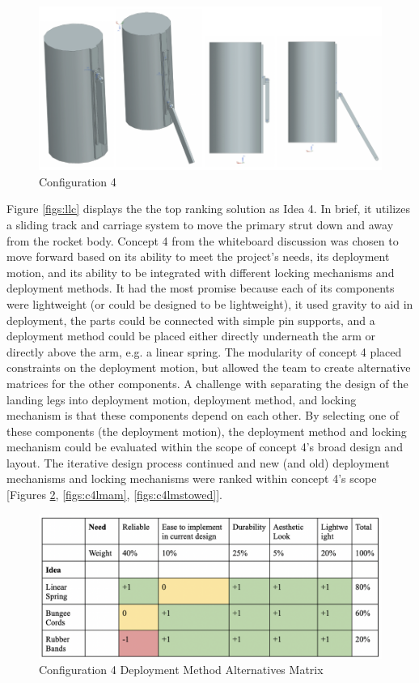 \begin{figure}[H]
\centering
\includegraphics[scale=0.8]{src/figs/landinglegconfig1.png}
\caption{Configuration 4}
\label{figs:llc1}
\end{figure}

Figure \ref{figs:llc} displays the the top ranking solution as Idea 4. In brief, it utilizes a sliding track and carriage system to move the primary strut down and away from the rocket body. Concept 4 from the whiteboard discussion was chosen to move forward based on its ability to meet the project's needs, its deployment motion, and its ability to be integrated with different locking mechanisms and deployment methods. It had the most promise because each of its components were lightweight (or could be designed to be lightweight), it used gravity to aid in deployment, the parts could be connected with simple pin supports, and a deployment method could be placed either directly underneath the arm or directly above the arm, e.g. a linear spring. The modularity of concept 4 placed constraints on the deployment motion, but allowed the team to create alternative matrices for the other components. A challenge with separating the design of the landing legs into deployment motion, deployment method, and locking mechanism is that these components depend on each other. By selecting one of these components (the deployment motion), the deployment method and locking mechanism could be evaluated within the scope of concept 4’s broad design and layout. The iterative design process continued and new (and old) deployment mechanisms and locking mechanisms were ranked within concept 4's scope [Figures \ref{figs:c4dmam}, \ref{figs:c4lmam}, \ref{figs:c4lmstowed}]. 

\begin{figure}[H]
\centering
\includegraphics[scale=0.7]{src/figs/Concept4dmam.png}
\caption{Configuration 4 Deployment Method Alternatives Matrix}
\label{figs:c4dmam}
\end{figure}

